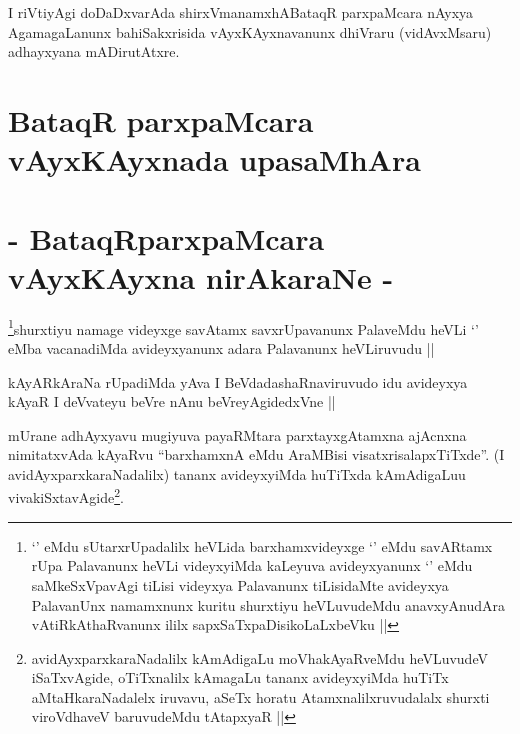 \begin{artha}
I riVtiyAgi doDaDxvarAda shirxVmanamxhABataqR parxpaMcara nAyxya
AgamagaLanunx bahiSakxrisida vAyxKAyxnavanunx dhiVraru (vidAvxMsaru)
adhayxyana mADirutAtxre.
\end{artha}

\section*{BataqR parxpaMcara vAyxKAyxnada upasaMhAra}

\section*{- BataqRparxpaMcara vAyxKAyxna nirAkaraNe -}

\begin{artha}
\footnote{`\stext' eMdu sUtarxrUpadalilx heVLida barxhamxvideyxge
  `\stext' eMdu savARtamx rUpa Palavanunx heVLi videyxyiMda kaLeyuva
  avideyxyanunx `\stext' eMdu saMkeSxVpavAgi tiLisi videyxya
  Palavanunx tiLisidaMte avideyxya PalavanUnx namamxnunx kuritu
  shurxtiyu heVLuvudeMdu anavxyAnudAra vAtiRkAthaRvanunx ililx
  sapxSaTxpaDisikoLaLxbeVku ||}shurxtiyu namage videyxge savAtamx savxrUpavanunx PalaveMdu
heVLi `\stext' eMba vacanadiMda avideyxyanunx adara Palavanunx
heVLiruvudu ||
\end{artha}


\begin{artha}
kAyARkAraNa rUpadiMda yAva I BeVdadashaRnaviruvudo idu avideyxya kAyaR
I deVvateyu beVre nAnu beVreyAgidedxVne ||
\end{artha}


\begin{artha}
mUrane adhAyxyavu mugiyuva payaRMtara parxtayxgAtamxna ajAcnxna
nimitatxvAda kAyaRvu ``barxhamxnA eMdu AraMBisi
visatxrisalapxTiTxde''. (I avidAyxparxkaraNadalilx) tananx
avideyxyiMda huTiTxda kAmAdigaLuu
vivakiSxtavAgide\footnote{avidAyxparxkaraNadalilx kAmAdigaLu
  moVhakAyaRveMdu heVLuvudeV iSaTxvAgide, oTiTxnalilx kAmagaLu tananx
  avideyxyiMda huTiTx aMtaHkaraNadalelx iruvavu, aSeTx horatu
  Atamxnalilxruvudalalx shurxti viroVdhaveV baruvudeMdu tAtapxyaR ||}. 
\end{artha}

